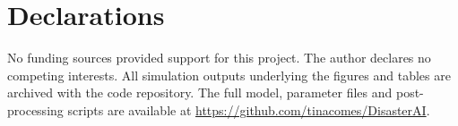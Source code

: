 \documentclass[pdflatex,sn-nature]{sn-jnl}
\begin{document}

\section*{Declarations}

 No funding sources provided support for this project.
 The author declares no competing interests.
 All simulation outputs underlying the figures and tables are archived with the code repository.
 The full model, parameter files and post-processing scripts are available at \url{https://github.com/tinacomes/DisasterAI}.


\end{document}
